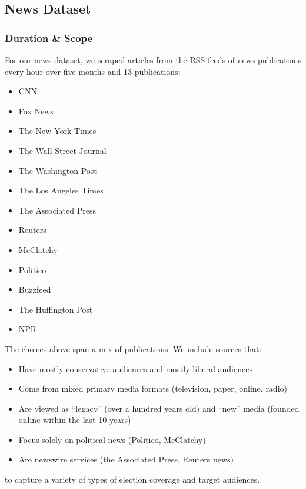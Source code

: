 \documentclass[letterpaper]{article}
\begin{document}
\subsection{News Dataset}

 \subsubsection{Duration \& Scope}
 For our news dataset, we scraped articles from the RSS feeds of news publications every hour over five months and 13 publications:

\begin{multicols}{2}
\begin{itemize}

\item CNN
\item Fox News
\item The New York Times
\item The Wall Street Journal
\item The Washington Post
\item The Los Angeles Times 
\item The Associated Press
\item Reuters
\item McClatchy 
\item Politico 
\item Buzzfeed
\item The Huffington Post
\item NPR 
\end{itemize}
\end{multicols}

The choices above span a mix of publications. We include sources that: 

\begin{itemize}
\item Have mostly conservative audiences and mostly liberal audiences \cite{PoliticalPolarization}
\item Come from mixed primary media formats (television, paper, online, radio)
\item Are viewed as ``legacy'' (over a hundred years old) and ``new'' media (founded online within the last 10 years)
\item Focus solely on political news (Politico, McClatchy)
\item Are newswire services (the Associated Press, Reuters news)
\end{itemize}
 
 to capture a variety of types of election coverage and target audiences.
 
\end{document}
